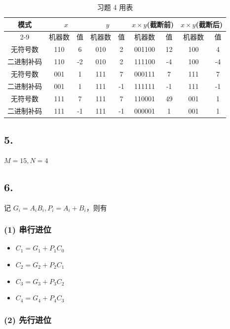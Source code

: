 \documentclass[12pt, a4paper]{ctexart}
\begin{document}
\begin{table}[H]
    \centering
    \begin{tabular}{|c|c|c|c|c|c|c|c|c|}
        \hline
        \multirow{2}{*}{模式} & \multicolumn{2}{c|}{$x$} & \multicolumn{2}{c|}{$y$} & \multicolumn{2}{c|}{$x\times y$(截断前)} & \multicolumn{2}{c|}{$x\times y$(截断后)} \\
        \cline{2-9}
        & 机器数 & 值 & 机器数 & 值 & 机器数 & 值 & 机器数 & 值 \\
        \hline
        无符号数 & 110 & 6 & 010 & 2 & 001100 & 12 & 100 & 4 \\
        二进制补码 & 110 & -2 & 010 & 2 & 111100 & -4 & 100 & -4 \\
        \hline
        无符号数 & 001 & 1 & 111 & 7 & 000111 & 7 & 111 & 7 \\
        二进制补码 & 001 & 1 & 111 & -1 & 111111 & -1 & 111 & -1 \\
        \hline
        无符号数 & 111 & 7 & 111 & 7 & 110001 & 49 & 001 & 1 \\
        二进制补码 & 111 & -1 & 111 & -1 & 000001 & 1 & 001 & 1 \\
        \hline
    \end{tabular}
    \caption{习题 4 用表}
\end{table}

\subsection*{5.}

$M=15,N=4$

\subsection*{6.}

记 $G_i=A_iB_i,P_i=A_i+B_i$，则有

\subsubsection*{(1) 串行进位}

\begin{itemize}
    \item $C_1=G_1+P_1C_0$
    \item $C_2=G_2+P_2C_1$
    \item $C_3=G_3+P_3C_2$
    \item $C_4=G_4+P_4C_3$
\end{itemize}

\subsubsection*{(2) 先行进位}
\end{document}
